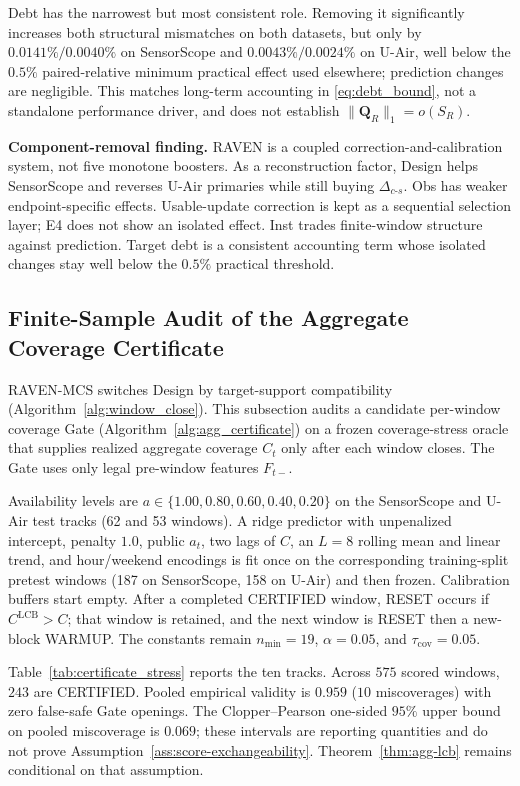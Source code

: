 \documentclass[letterpaper,journal]{IEEEtran}
\begin{document}
Debt has the narrowest but most consistent role.  Removing it significantly
increases both structural mismatches on both datasets, but only by
$0.0141\%/0.0040\%$ on SensorScope and
$0.0043\%/0.0024\%$ on U-Air, well below the $0.5\%$ paired-relative
minimum practical effect used elsewhere; prediction changes are negligible.
This matches long-term accounting in \eqref{eq:debt_bound}, not a
standalone performance driver, and does not establish
$\|\mathbf Q_R\|_1=o(S_R)$.

\noindent\textbf{Component-removal finding.}
RAVEN is a coupled correction-and-calibration system, not five monotone
boosters.  As a reconstruction factor, Design helps SensorScope and
reverses U-Air primaries while still buying $\Delta_{c\text{-}s}$.
Obs has weaker endpoint-specific effects.  Usable-update correction is
kept as a sequential selection layer; E4 does not show an isolated
effect.  Inst trades finite-window structure against prediction.
Target debt is a consistent accounting term whose isolated changes stay
well below the $0.5\%$ practical threshold.

\subsection{Finite-Sample Audit of the Aggregate Coverage Certificate}
\label{subsec:eval_certificate}

RAVEN-MCS switches Design by target-support compatibility
(Algorithm~\ref{alg:window_close}).  This subsection audits a candidate
per-window coverage Gate (Algorithm~\ref{alg:agg_certificate}) on a frozen
coverage-stress oracle that supplies realized aggregate coverage $C_t$
only after each window closes.  The Gate uses only legal pre-window
features $F_{t-}$.

Availability levels are $a\in\{1.00,0.80,0.60,0.40,0.20\}$ on the
SensorScope and U-Air test tracks (62 and 53 windows).  A ridge predictor
with unpenalized intercept, penalty $1.0$, public $a_t$, two lags of $C$,
an $L=8$ rolling mean and linear trend, and hour/weekend encodings is
fit once on the corresponding training-split pretest windows (187 on
SensorScope, 158 on U-Air) and then frozen.  Calibration buffers start
empty.  After a completed CERTIFIED window, RESET occurs if
$C^{\mathrm{LCB}}>C$; that window is retained, and the next window is
RESET then a new-block WARMUP.  The constants remain $n_{\min}=19$,
$\alpha=0.05$, and $\tau_{\mathrm{cov}}=0.05$.

Table~\ref{tab:certificate_stress} reports the ten tracks.
Across $575$ scored windows, $243$ are CERTIFIED.  Pooled empirical
validity is $0.959$ ($10$ miscoverages) with zero false-safe Gate
openings.  The Clopper--Pearson one-sided $95\%$ upper bound on pooled
miscoverage is $0.069$; these intervals are reporting quantities and do
not prove Assumption~\ref{ass:score-exchangeability}.
Theorem~\ref{thm:agg-lcb} remains conditional on that assumption.
\end{document}
